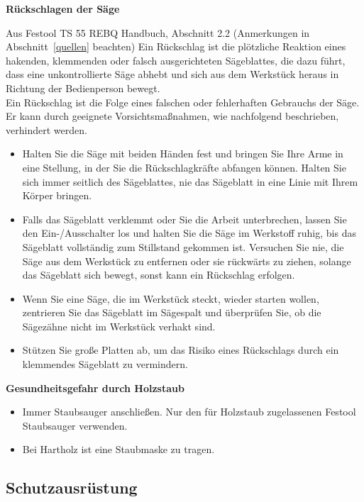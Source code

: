 \documentclass{\basedir/fablab-document}
\begin{document}
\textbf{Rückschlagen der Säge}
\begin{leftbar}{Aus Festool TS 55 REBQ Handbuch, Abschnitt 2.2 (Anmerkungen in Abschnitt~\ref{quellen} beachten)}
Ein Rückschlag ist die plötzliche Reaktion
eines hakenden, klemmenden oder falsch
ausgerichteten Sägeblattes, die dazu führt,
dass eine unkontrollierte Säge abhebt und
sich aus dem Werkstück heraus in Richtung der Bedienperson bewegt.\\
Ein Rückschlag ist die Folge eines falschen
oder fehlerhaften Gebrauchs der Säge. Er kann
durch geeignete Vorsichtsmaßnahmen, wie
nachfolgend beschrieben, verhindert werden.
\begin{itemize}
\item Halten Sie die Säge mit beiden Händen
fest und bringen Sie Ihre Arme in eine
Stellung, in der Sie die Rückschlagkräfte
abfangen können. Halten Sie sich immer
seitlich des Sägeblattes, nie das Sägeblatt
in eine Linie mit Ihrem Körper bringen. 
\item Falls das Sägeblatt verklemmt oder Sie
die Arbeit unterbrechen, lassen Sie den
Ein-/Ausschalter los und halten Sie die
Säge im Werkstoff ruhig, bis das Sägeblatt
vollständig zum Stillstand gekommen ist.
Versuchen Sie nie, die Säge aus dem
Werkstück zu entfernen oder sie rückwärts zu ziehen, solange das Sägeblatt
sich bewegt, sonst kann ein Rückschlag
erfolgen.
\item Wenn Sie eine Säge, die im Werkstück
steckt, wieder starten wollen, zentrieren
Sie das Sägeblatt im Sägespalt und überprüfen Sie, ob die Sägezähne nicht im
Werkstück verhakt sind. 
\item Stützen Sie große Platten ab, um das Risiko eines Rückschlags durch ein klemmendes Sägeblatt zu vermindern.

\end{itemize}
\end{leftbar}

\textbf{Gesundheitsgefahr durch Holzstaub}
\begin{itemize}
	\item Immer Staubsauger anschließen. Nur den für Holzstaub zugelassenen Festool Staubsauger verwenden.
	\item Bei Hartholz ist eine Staubmaske zu tragen.
\end{itemize}

\subsection{Schutzausrüstung}
\end{document}
